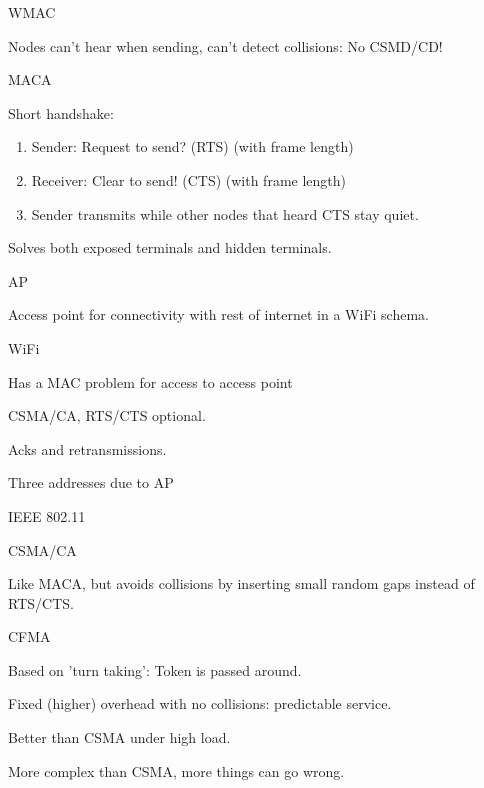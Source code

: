 \documentclass[main.tex]{subfiles}
\begin{document}
\begin{card}{WMAC}
\item Nodes can't hear when sending, can't detect collisions: No CSMD/CD!
\end{card}

\begin{card}{MACA}
\item Short handshake:
    \begin{enumerate}
        \item Sender: Request to send? (RTS) (with frame length)
        \item Receiver: Clear to send! (CTS) (with frame length)
        \item Sender transmits while other nodes that heard CTS stay quiet.
    \end{enumerate}
\item Solves both exposed terminals and hidden terminals.
\end{card}

\begin{card}{AP}
\item Access point for connectivity with rest of internet in a WiFi schema.
\end{card}

\begin{card}{WiFi}
\item Has a MAC problem for access to access point
\item CSMA/CA, RTS/CTS optional.
\item Acks and retransmissions.
\item Three addresses due to AP
\item IEEE 802.11
\end{card}

\begin{card}{CSMA/CA}
\item Like MACA, but avoids collisions by inserting small random gaps instead of RTS/CTS.
\end{card}

\begin{card}{CFMA}
\item Based on 'turn taking': Token is passed around.
\item Fixed (higher) overhead with no collisions: predictable service.
\item Better than CSMA under high load.
\item More complex than CSMA, more things can go wrong.
\end{card}
\end{document}
